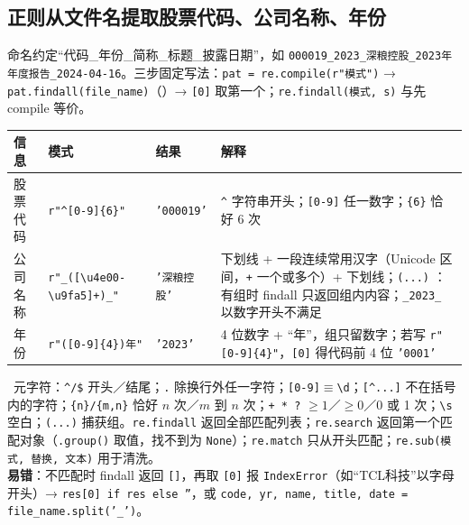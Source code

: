 \subsection{正则从文件名提取股票代码、公司名称、年份}
命名约定“代码\_年份\_简称\_标题\_披露日期”，如 \texttt{000019\_2023\_深粮控股\_2023年年度报告\_2024-04-16}。三步固定写法：\texttt{pat = re.compile(r"模式")} → \texttt{pat.findall(file\_name)}（）→ \texttt{[0]} 取第一个；\texttt{re.findall(模式, s)} 与先 compile 等价。
\begin{tabD08a}
\begin{tabularx}{\linewidth}{@{}p{1.3cm}p{3.5cm}p{1.5cm}L@{}}
\toprule
信息 & 模式 & 结果 & 解释 \\
\midrule
股票代码 & \texttt{r"\textasciicircum[0-9]\{6\}"} & \texttt{'000019'} & \texttt{\textasciicircum} 字符串开头；\texttt{[0-9]} 任一数字；\texttt{\{6\}} 恰好 6 次 \\
公司名称 & \texttt{r"\_([\textbackslash u4e00-\textbackslash u9fa5]+)\_"} & \texttt{'深粮控股'} & 下划线 + 一段连续常用汉字（Unicode 区间，\texttt{+} 一个或多个）+ 下划线；\texttt{(...)} ：有组时 findall 只返回组内内容；\texttt{\_2023\_} 以数字开头不满足 \\
年份 & \texttt{r"([0-9]\{4\})年"} & \texttt{'2023'} & 4 位数字 + “年”，组只留数字；若写 \texttt{r"[0-9]\{4\}"}，\texttt{[0]} 得代码前 4 位 \texttt{'0001'} \\
\bottomrule
\end{tabularx}
\end{tabD08a}
\tagext\ 元字符：\texttt{\textasciicircum/\$} 开头／结尾；\texttt{.} 除换行外任一字符；\texttt{[0-9]}$\equiv$\texttt{\textbackslash d}；\texttt{[\textasciicircum...]} 不在括号内的字符；\texttt{\{n\}/\{m,n\}} 恰好 $n$ 次／$m$ 到 $n$ 次；\texttt{+ * ?} $\ge1$／$\ge0$／0 或 1 次；\texttt{\textbackslash s} 空白；\texttt{(...)} 捕获组。\texttt{re.findall} 返回全部匹配列表；\texttt{re.search} 返回第一个匹配对象（\texttt{.group()} 取值，找不到为 \texttt{None}）；\texttt{re.match} 只从开头匹配；\texttt{re.sub(模式, 替换, 文本)} 用于清洗。\\
\textbf{易错}：不匹配时 findall 返回 \texttt{[]}，再取 \texttt{[0]} 报 \texttt{IndexError}（如“TCL科技”以字母开头）→ \texttt{res[0] if res else ''}，或 \texttt{code, yr, name, title, date = file\_name.split('\_')}。

